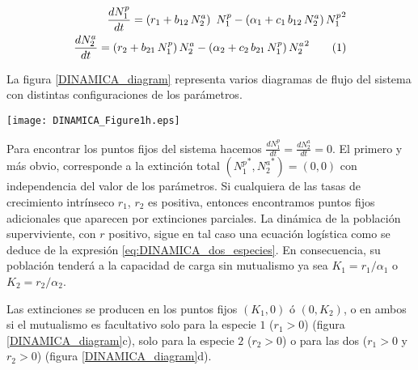 \begin{align}
\frac{dN^p_{1}}{dt} = \left( r_{1}+ b_{12}\, N^a_{2}\right) \ N^p_{1} - \left(\alpha_{1}+ c_{1} \, b_{12} \, N^a_{2} \right) {N^p_{1}}^2 \nonumber\\ 
\frac{dN^a_{2}}{dt} = \left( r_{2}+ b_{21}\, N^p_{1}\right)N^a_{2} - \left(\alpha_{2}+ c_{2} \, b_{21}\, N^p_{1} \right) {N^a_{2}}^2
\stepcounter{equation}\tag{\theequation}\label{eq:DINAMICA_dos_especies}
\end{align}

La figura \ref{DINAMICA_diagram} representa varios diagramas de flujo del sistema con distintas configuraciones de los parámetros.

\begin{figure*}
\centering
\texttt{[image: DINAMICA\_Figure1h.eps]}
\caption {Diagrama de flujo de la dinámica de una comunidad de dos especies según el modelo de ecuaciones \ref{eq:DINAMICA_dos_especies}. Los puntos fijos se han resaltado como círculos de color rojo. El color de las flechas indica la intensidad del flujo. Las cuatro imágenes corresponden a diferentes valores para las tasas intrínsecas de crecimiento. El resto de parámetros mantiene los mismos valores en los cuatro casos: $\alpha_1 = \alpha_2 = 0.008$, $b_{12} = b_{21} = 0.4$ y $c_1 = c_2 = 0.008$. El mutualismo es obligatorio en a) y b), aunque en diferente grado en el segundo diagrama. Es obligatorio para la especie 2 en c), mientras que la especie 1 podría sobrevivir sin la 2. En d) el mutualismo es facultativo para ambas especies.}
\label{DINAMICA_diagram}
\end{figure*}

Para encontrar los puntos fijos del sistema hacemos $\frac{dN^p_{1}}{dt} = \frac{dN^a_{2}}{dt} = 0$. El primero y más obvio, corresponde a la extinción total $({N^p_{1}}^*,{N^a_{2}}^*) = (0,0)$ con independencia del valor de los parámetros. Si cualquiera de las tasas de crecimiento intrínseco $r_1$, $r_2$ es positiva, entonces encontramos puntos fijos adicionales que aparecen por extinciones parciales. La dinámica de la población superviviente, con $r$ positivo, sigue en tal caso una ecuación logística como se deduce de la expresión \ref{eq:DINAMICA_dos_especies}. En consecuencia, su población tenderá a la capacidad de carga sin mutualismo ya sea $K_1 = r_1/\alpha_1$ o $K_2 = r_2/\alpha_2$. 

Las extinciones se producen en los puntos fijos $(K_1,0)$ ó $(0,K_2)$, o en ambos si el mutualismo es facultativo solo para la especie $1$ ($r_1 >0$) (figura \ref{DINAMICA_diagram}c), solo para la especie $2$ ($r_2 >0$) o para las dos ($r_1>0$ y $r_2 >0$) (figura \ref{DINAMICA_diagram}d). 

